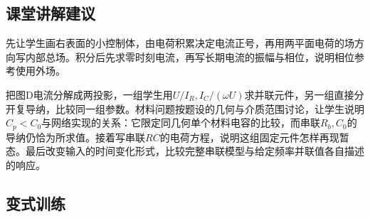 \documentclass[UTF8,fontset=fandol,a4paper,11pt]{ctexart}
\begin{document}


\subsection*{课堂讲解建议}

先让学生画右表面的小控制体，由电荷积累决定电流正号，再用两平面电荷的场方向写内部总场。积分后先求零时刻电流，再写长期电流的振幅与相位，说明相位参考使用外场。

把图D电流分解成两投影，一组学生用$U/I_R,I_C/(\omega U)$求并联元件，另一组直接分开复导纳，比较同一组参数。材料问题按题设的几何与介质范围讨论，让学生说明$C_p<C_0$与网络实现的关系：它限定同几何单个材料电容的比较，而串联$R_b,C_0$的导纳仍恰为所求值。接着写串联$RC$的电荷方程，说明这组固定元件怎样再现暂态。最后改变输入的时间变化形式，比较完整串联模型与给定频率并联值各自描述的响应。



\subsection*{变式训练}
\end{document}
